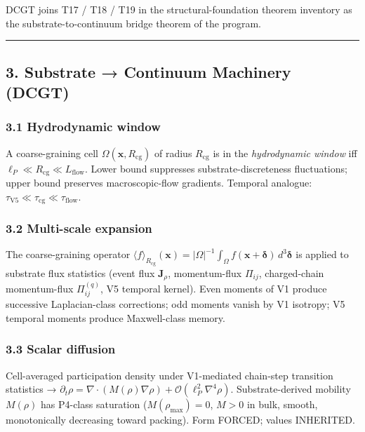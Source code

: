 \documentclass[
  11pt,
  a4paper,
]{article}
\begin{document}
DCGT joins T17 / T18 / T19 in the structural-foundation theorem
inventory as the substrate-to-continuum bridge theorem of the program.

\begin{center}\rule{0.5\linewidth}{0.5pt}\end{center}

\subsection{3. Substrate → Continuum Machinery
(DCGT)}\label{substrate-continuum-machinery-dcgt}

\subsubsection{3.1 Hydrodynamic window}\label{hydrodynamic-window}

A coarse-graining cell \(\Omega(\mathbf{x},R_\mathrm{cg})\) of radius
\(R_\mathrm{cg}\) is in the \emph{hydrodynamic window} iff
\(\ell_P \ll R_\mathrm{cg} \ll L_\mathrm{flow}\). Lower bound suppresses
substrate-discreteness fluctuations; upper bound preserves
macroscopic-flow gradients. Temporal analogue:
\(\tau_\mathrm{V5} \ll \tau_\mathrm{cg} \ll \tau_\mathrm{flow}\).

\subsubsection{3.2 Multi-scale expansion}\label{multi-scale-expansion}

The coarse-graining operator
\(\langle f\rangle_{R_\mathrm{cg}}(\mathbf{x}) = |\Omega|^{-1}\int_\Omega f(\mathbf{x}+\boldsymbol{\delta})\,d^3\boldsymbol{\delta}\)
is applied to substrate flux statistics (event flux \(\mathbf{J}_\rho\),
momentum-flux \(\Pi_{ij}\), charged-chain momentum-flux
\(\Pi^{(q)}_{ij}\), V5 temporal kernel). Even moments of V1 produce
successive Laplacian-class corrections; odd moments vanish by V1
isotropy; V5 temporal moments produce Maxwell-class memory.

\subsubsection{3.3 Scalar diffusion}\label{scalar-diffusion}

Cell-averaged participation density under V1-mediated chain-step
transition statistics →
\(\partial_t\rho = \nabla\cdot(M(\rho)\nabla\rho) + \mathcal{O}(\ell_P^2\nabla^4\rho)\).
Substrate-derived mobility \(M(\rho)\) has P4-class saturation
(\(M(\rho_\mathrm{max}) = 0\), \(M > 0\) in bulk, smooth, monotonically
decreasing toward packing). Form FORCED; values INHERITED.
\end{document}
